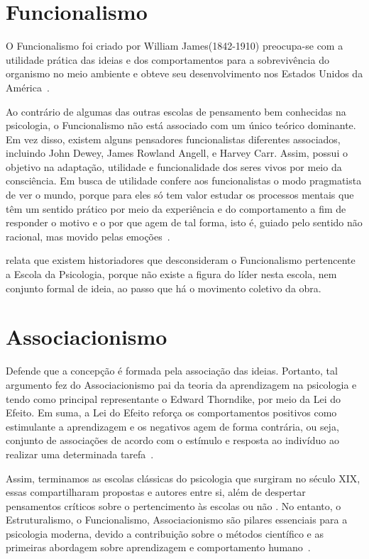 \section{Funcionalismo}\label{funcionalismo}

O Funcionalismo foi criado por William James(1842-1910) preocupa-se com a utilidade prática das ideias e dos comportamentos para a sobrevivência do organismo no meio ambiente e obteve seu desenvolvimento nos Estados Unidos da América~\cite{hothersall1997historia}.

Ao contrário de algumas das outras escolas de pensamento bem conhecidas na psicologia, o Funcionalismo não está associado com um único teórico dominante. 
Em vez disso, existem alguns pensadores funcionalistas diferentes associados, incluindo John Dewey, James Rowland Angell, e Harvey Carr.
Assim, possui o objetivo na adaptação, utilidade e funcionalidade dos seres vivos por meio da consciência.
Em busca de utilidade confere aos funcionalistas o modo pragmatista de ver o mundo, porque para eles só tem valor estudar os processos mentais que têm um sentido prático por meio da experiência e do comportamento a fim de responder o motivo e o por que agem de tal forma, isto é, guiado pelo sentido não racional, mas movido pelas emoções~\cite{bock1999psicologias,silva2007psicologia_educacao}.

 relata que existem historiadores que desconsideram o Funcionalismo pertencente a Escola da Psicologia, porque não existe a figura do líder nesta escola, nem conjunto formal de ideia, ao passo que há o movimento coletivo da obra. 


\section{Associacionismo}

Defende que a concepção é formada pela associação das ideias.
Portanto, tal argumento fez do Associacionismo pai da teoria da aprendizagem na psicologia e tendo como principal representante o Edward Thorndike, por meio da Lei do Efeito.
Em suma, a Lei do Efeito reforça os comportamentos positivos como estimulante a aprendizagem e os negativos agem de forma contrária, ou seja, conjunto de associações de acordo com o estímulo e resposta ao indivíduo ao realizar uma determinada tarefa~\cite{bock1999psicologias}.


Assim, terminamos as escolas clássicas do psicologia que surgiram no século XIX, essas compartilharam propostas e autores entre si, além de despertar pensamentos críticos sobre o pertencimento às escolas ou não \cite{hothersall1997historia}.
No entanto, o Estruturalismo, o Funcionalismo, Associacionismo são pilares essenciais para a psicologia moderna, devido a contribuição sobre o métodos científico e as primeiras abordagem sobre aprendizagem e comportamento humano~\cite{bock1999psicologias}.

